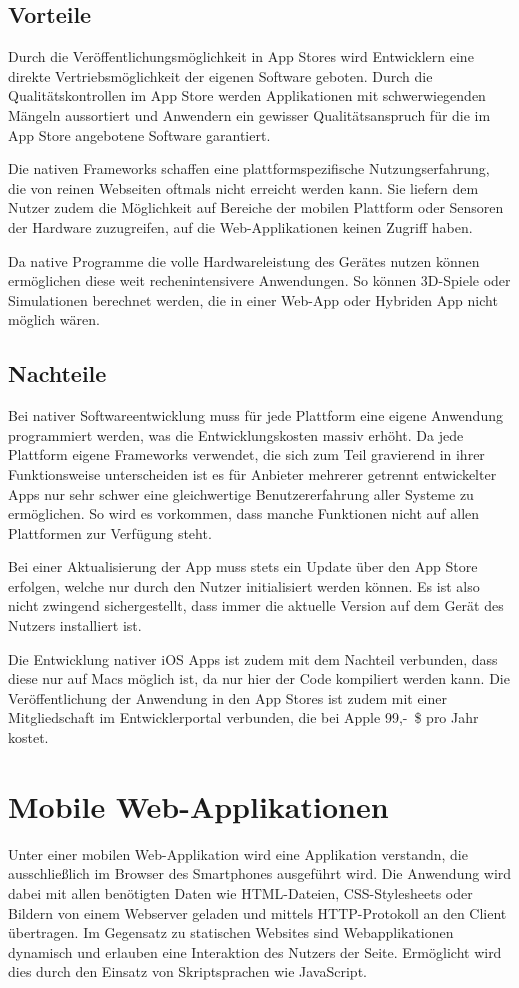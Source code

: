 \subsection{Vorteile}
%
Durch die Veröffentlichungsmöglichkeit in App Stores wird Entwicklern eine direkte Vertriebsmöglichkeit der eigenen Software geboten. Durch die Qualitätskontrollen im App Store werden Applikationen mit schwerwiegenden Mängeln aussortiert und Anwendern ein gewisser Qualitätsanspruch für die im App Store angebotene Software garantiert.

Die nativen Frameworks schaffen eine plattformspezifische Nutzungserfahrung, die von reinen Webseiten oftmals nicht erreicht werden kann. Sie liefern dem Nutzer zudem die Möglichkeit auf Bereiche der mobilen Plattform oder Sensoren der Hardware zuzugreifen, auf die Web-Applikationen keinen Zugriff haben.

Da native Programme die volle Hardwareleistung des Gerätes nutzen können ermöglichen diese weit rechenintensivere Anwendungen. So können 3D-Spiele oder Simulationen berechnet werden, die in einer Web-App oder Hybriden App nicht möglich wären.
%
\subsection{Nachteile}
%
Bei nativer Softwareentwicklung muss für jede Plattform eine eigene Anwendung programmiert werden, was die Entwicklungskosten massiv erhöht. Da jede Plattform eigene Frameworks verwendet, die sich zum Teil gravierend in ihrer Funktionsweise unterscheiden ist es für Anbieter mehrerer getrennt entwickelter Apps nur sehr schwer eine gleichwertige Benutzererfahrung aller Systeme zu ermöglichen. So wird es vorkommen, dass manche Funktionen nicht auf allen Plattformen zur Verfügung steht.

Bei einer Aktualisierung der App muss stets ein Update über den App Store erfolgen, welche nur durch den Nutzer initialisiert werden können. Es ist also nicht zwingend sichergestellt, dass immer die aktuelle Version auf dem Gerät des Nutzers installiert ist.

Die Entwicklung nativer iOS Apps ist zudem mit dem Nachteil verbunden, dass diese nur auf Macs möglich ist, da nur hier der Code kompiliert werden kann. Die Veröffentlichung der Anwendung in den App Stores ist zudem mit einer Mitgliedschaft im Entwicklerportal verbunden, die bei Apple 99,-~\$ pro Jahr kostet. 
%
%
\section{Mobile Web-Applikationen}
\label{mobileWebApplikationen}
%
Unter einer mobilen Web-Applikation wird eine Applikation verstandn, die ausschließlich im Browser des Smartphones ausgeführt wird. Die Anwendung wird dabei mit allen benötigten Daten wie HTML-Dateien, CSS-Stylesheets oder Bildern von einem Webserver geladen und mittels HTTP-Protokoll an den Client übertragen. Im Gegensatz zu statischen Websites sind Webapplikationen dynamisch und erlauben eine Interaktion des Nutzers der Seite. Ermöglicht wird dies durch den Einsatz von Skriptsprachen wie JavaScript. 

